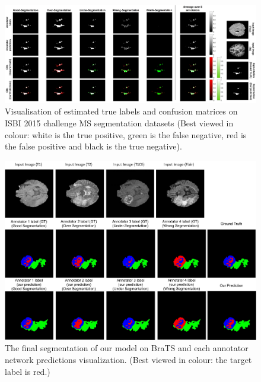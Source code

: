 \begin{figure}[h]
    \centering
    \includegraphics[width=\linewidth]{chapter_8/picture5.jpg}
    \caption{Visualisation of estimated true labels and confusion matrices on ISBI 2015 challenge MS segmentation datasets (Best viewed in colour: white is the true positive, green is the false negative, red is the false positive and black is the true negative).}
    \label{CMs of MS}
\end{figure}

\begin{figure}[h]
        \center
        \includegraphics[scale=0.12]{chapter_8/picture6.jpg}
        \caption{The final segmentation of our model on BraTS and each annotator network predictions visualization. (Best viewed in colour: the target label is red.)}
        \label{Brats results}
\end{figure}

